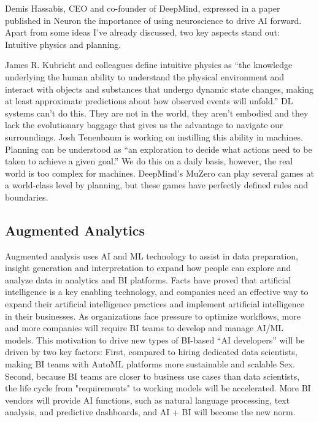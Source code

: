 \documentclass{article}
\begin{document}
Demis Hassabis, CEO and co-founder of DeepMind, expressed in a paper published in Neuron \cite{39}the importance of using neuroscience to drive AI forward. Apart from some ideas I’ve already discussed, two key aspects stand out: Intuitive physics and planning.

James R. Kubricht and colleagues define intuitive physics as “the knowledge underlying the human ability to understand the physical environment and interact with objects and substances that undergo dynamic state changes, making at least approximate predictions about how observed events will unfold.” DL systems can’t do this. They are not in the world, they aren’t embodied and they lack the evolutionary baggage that gives us the advantage to navigate our surroundings. Josh Tenenbaum is working on instilling this ability in machines.
Planning can be understood as “an exploration to decide what actions need to be taken to achieve a given goal.” We do this on a daily basis, however, the real world is too complex for machines. DeepMind’s MuZero can play several games at a world-class level by planning, but these games have perfectly defined rules and boundaries.

\subsection{Augmented Analytics}
Augmented analysis uses AI and ML technology to assist in data preparation, insight generation and interpretation to expand how people can explore and analyze data in analytics and BI platforms. 
Facts have proved that artificial intelligence is a key enabling technology, and companies need an effective way to expand their artificial intelligence practices and implement artificial intelligence in their businesses. As organizations face pressure to optimize workflows, more and more companies will require BI teams to develop and manage AI/ML models. This motivation to drive new types of BI-based ``AI developers'' will be driven by two key factors: First, compared to hiring dedicated data scientists, making BI teams with AutoML platforms more sustainable and scalable Sex. Second, because BI teams are closer to business use cases than data scientists, the life cycle from "requirements" to working models will be accelerated. More BI vendors will provide AI functions, such as natural language processing, text analysis, and predictive dashboards, and AI + BI will become the new norm.
\end{document}
